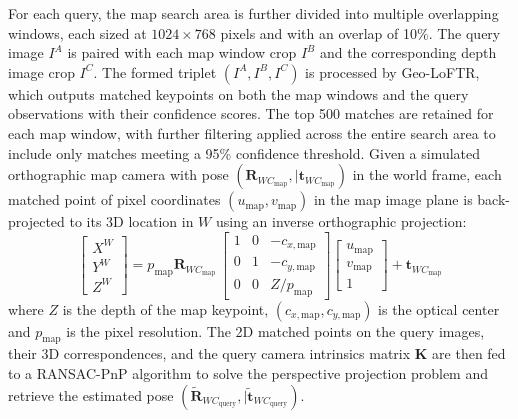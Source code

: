 For each query, the map search area is further divided into multiple overlapping windows, each sized at $1024 \times 768$ pixels and with an overlap of 10\%. The query image $I^A$ is paired with each map window crop $I^B$ and the corresponding depth image crop $I^C$. The formed triplet $(I^A, I^B, I^C)$ is processed by Geo-LoFTR, which outputs matched keypoints on both the map windows and the query observations with their confidence scores. The top 500 matches are retained for each map window, with further filtering applied across the entire search area to include only matches meeting a 95\% confidence threshold. Given a simulated orthographic map camera with pose $(\mathbf{R}_{WC_{\text{map}}}, \vert \mathbf{t}_{WC_{\text{map}}})$ in the world frame, each matched  point of pixel coordinates $(u_{\text{map}}, v_{\text{map}})$ in the map image plane is back-projected to its 3D location in $W$ using an inverse orthographic projection:
\begin{equation*}
     \begin{bmatrix} X^W \\ Y^W \\ Z^W \end{bmatrix} = p_{\text{map}} \mathbf{R}_{WC_{\text{map}}} \, \begin{bmatrix} 
                    1 & 0 & -c_{x,{\text{map}}} \\
                    0 & 1 &  - c_{y,{\text{map}}}  \\
                    0 & 0 &Z/p_{\text{map}}  \end{bmatrix} \begin{bmatrix} u_{\text{map}} \\ v_{\text{map}} \\ 1
                    \end{bmatrix} + \mathbf{t}_{WC_{\text{map}}}
    \label{eq:backproj_map_pts}
\end{equation*}
where $Z$ is the depth of the map keypoint,  $(c_{x,{\text{map}}}, c_{y,{\text{map}}})$ is the optical center and $p_{\text{map}}$ is the pixel resolution. 
The 2D matched points on the query images, their 3D correspondences, and the query camera intrinsics matrix $\mathbf{K}$ are then fed to a RANSAC-PnP algorithm to solve the perspective projection problem 
and retrieve the estimated pose $(\widetilde{\mathbf{R}}_{WC_{\text{query}}}, \vert \widetilde{\mathbf{t}}_{WC_{\text{query}}})$.
